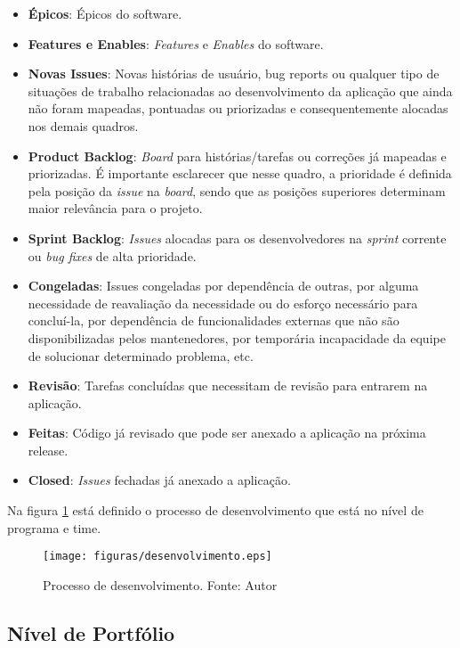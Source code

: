 \begin{itemize}
  \item \textbf{Épicos}: Épicos do software.
  \item \textbf{Features e Enables}: \textit{Features} e \textit{Enables} do software.
  \item \textbf{Novas Issues}: Novas histórias de usuário, bug reports ou qualquer tipo de situações de trabalho relacionadas ao desenvolvimento da aplicação que ainda não foram mapeadas, pontuadas ou priorizadas e consequentemente alocadas nos demais quadros.
  \item \textbf{Product Backlog}: \textit{Board} para histórias/tarefas ou correções já mapeadas e priorizadas. É importante esclarecer que nesse quadro, a prioridade é definida pela posição da \textit{issue} na \textit{board}, sendo que as posições superiores determinam maior relevância para o projeto.
  \item \textbf{Sprint Backlog}: \textit{Issues} alocadas para os desenvolvedores na \textit{sprint} corrente ou \textit{bug fixes} de alta prioridade.
  \item \textbf{Congeladas}: Issues congeladas por dependência de outras, por alguma necessidade de reavaliação da necessidade ou do esforço necessário para concluí-la, por dependência de funcionalidades externas que não são disponibilizadas pelos mantenedores, por temporária incapacidade da equipe de solucionar determinado problema, etc.
  \item \textbf{Revisão}: Tarefas concluídas que necessitam de revisão para entrarem na aplicação.
  \item \textbf{Feitas}: Código já revisado que pode ser anexado a aplicação na próxima release.
  \item \textbf{Closed}: \textit{Issues} fechadas já anexado a aplicação.
\end{itemize}

Na figura \ref{fig:desenvolvimento} está definido o processo de desenvolvimento que está no nível de programa e time.

\begin{figure}[h!]
	\centering
  \texttt{[image: figuras/desenvolvimento.eps]}
  \caption[Processo de desenvolvimento.]{Processo de desenvolvimento. Fonte: Autor}
	\label{fig:desenvolvimento}
\end{figure}

\subsection{Nível de Portfólio}

